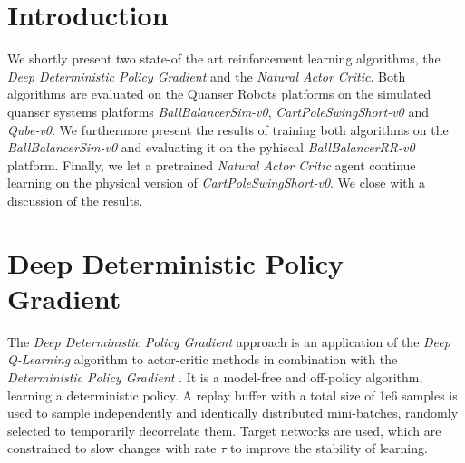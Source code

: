 
\author{Yannik Frisch \and Tabea Wilke \and Maximilian Gehrke %
}

\maketitle

\section{Introduction}
\label{sec:intro}
We shortly present two state-of the art reinforcement learning algorithms, the \textit{Deep Deterministic Policy Gradient} and the \textit{Natural Actor Critic}. Both algorithms are evaluated on the Quanser Robots platforms  on the simulated quanser systems platforms \textit{BallBalancerSim-v0}, \textit{CartPoleSwingShort-v0} and \textit{Qube-v0}. We furthermore present the results of training both algorithms on the \textit{BallBalancerSim-v0} and evaluating it on the pyhiscal \textit{BallBalancerRR-v0} platform. Finally, we let a pretrained \textit{Natural Actor Critic} agent continue learning on the physical version of \textit{CartPoleSwingShort-v0}. We close with a discussion of the results.
\newpage
\section{Deep Deterministic Policy Gradient}
\label{sec:ddpg}
The \textit{Deep Deterministic Policy Gradient} approach \citep{lillicrap2015continuous} is an application of the \textit{Deep Q-Learning} algorithm \citep{mnih2013playing} to actor-critic methods \citep{konda2000actor} in combination with the \textit{Deterministic Policy Gradient} \citep{silver2014deterministic}. It is a model-free and off-policy algorithm, learning a deterministic policy. A replay buffer with a total size of 1e6 samples is used to sample independently and identically distributed mini-batches, randomly selected to temporarily decorrelate them. Target networks are used, which are constrained to slow changes with rate $\tau$ to improve the stability of learning.

